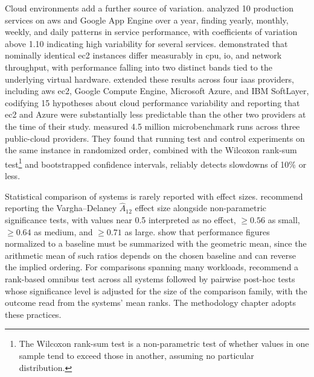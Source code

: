 Cloud environments add a further source of variation. \textcite{iosup2011_performance_variability_cloud_services} analyzed \num{10} production services on \acrlong{aws} and Google App Engine over a year, finding yearly, monthly, weekly, and daily patterns in service performance, with coefficients of variation above \num{1.10} indicating high variability for several services. \textcite{schad2010_runtime_measurements_cloud} demonstrated that nominally identical \acrfull{ec2} instances differ measurably in \acrshort{cpu}, \acrshort{io}, and network throughput, with performance falling into two distinct bands tied to the underlying virtual hardware. \textcite{leitner2016_patterns_chaos_iaas} extended these results across four \acrshort{iaas} providers, including \acrshort{aws} \acrshort{ec2}, Google Compute Engine, Microsoft Azure, and IBM SoftLayer, codifying \num{15} hypotheses about cloud performance variability and reporting that \acrshort{ec2} and Azure were substantially less predictable than the other two providers at the time of their study. \textcite{laaber2019_software_microbenchmarking_cloud} measured \num{4.5} million microbenchmark runs across three public-cloud providers. They found that running test and control experiments on the same instance in randomized order, combined with the Wilcoxon rank-sum test\footnote{The Wilcoxon rank-sum test is a non-parametric test of whether values in one sample tend to exceed those in another, assuming no particular distribution.} and bootstrapped confidence intervals, reliably detects slowdowns of \num{10}\% or less.

Statistical comparison of systems is rarely reported with effect sizes. \textcite{arcuri2014_hitchhiker_statistical_tests} recommend reporting the Vargha--Delaney $\hat{A}_{12}$ effect size alongside non-parametric significance tests, with values near \num{0.5} interpreted as no effect, $\geq \num{0.56}$ as small, $\geq \num{0.64}$ as medium, and $\geq \num{0.71}$ as large. \textcite{fleming1986_how_not_to_lie_with_statistics} show that performance figures normalized to a baseline must be summarized with the geometric mean, since the arithmetic mean of such ratios depends on the chosen baseline and can reverse the implied ordering. For comparisons spanning many workloads, \textcite{demsar2006_statistical_comparisons_classifiers} recommend a rank-based omnibus test across all systems followed by pairwise post-hoc tests whose significance level is adjusted for the size of the comparison family, with the outcome read from the systems' mean ranks. The methodology chapter adopts these practices.